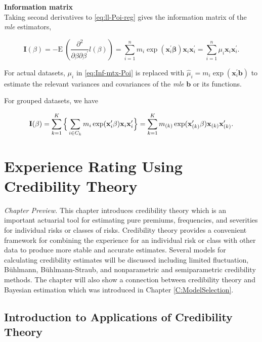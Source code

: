 \documentclass[]{book}
\theoremstyle{definition}
\theoremstyle{definition}
\theoremstyle{definition}
\theoremstyle{remark}
\begin{document}
\textbf{Information matrix}\\
Taking second derivatives to \eqref{eq:ll-Poi-reg} gives the information
matrix of the \emph{mle} estimators,

\begin{equation}
\mathbf{ I}(\beta)=-\mathrm{E~}{\left( \frac{\partial^2}{\partial \beta\partial \beta^{\prime}}l(\beta) \right)}=\sum^n_{i=1}m_i \exp(\mathbf{ x}^{\prime}_i \mathbf{ \beta})\mathbf{ x}_i \mathbf{ x}_i^{\prime}=\sum^n_{i=1} {\mu}_i \mathbf{ x}_i \mathbf{ x}_i^{\prime}.
\label{eq:Inf-mtx-Poi}
\end{equation}

For actual datasets, \({\mu}_i\) in \eqref{eq:Inf-mtx-Poi} is replaced
with \(\hat{\mu}_i=m_i \exp(\mathbf{ x}^{\prime}_i \mathbf{ b})\) to
estimate the relevant variances and covariances of the \emph{mle}
\(\mathbf{ b}\) or its functions.

For grouped datasets, we have

\begin{equation}
\mathbf{ I}(\beta)=\sum^K_{k=1} \Big{\{}\sum_{i \in C_k}m_i \exp(\mathbf{ x}^{\prime}_i \mathbf{ \beta})\mathbf{ x}_i \mathbf{ x}_i^{\prime} \Big{\}}=\sum^K_{k=1} m_{(k)} \exp(\mathbf{ x}^{\prime}_{(k)} \mathbf{ \beta})\mathbf{ x}_{(k)} \mathbf{ x}_{(k)}^{\prime}.
\end{equation}

\chapter{Experience Rating Using Credibility
Theory}\label{C:Credibility}

\emph{Chapter Preview.} This chapter introduces credibility theory which
is an important actuarial tool for estimating pure premiums,
frequencies, and severities for individual risks or classes of risks.
Credibility theory provides a convenient framework for combining the
experience for an individual risk or class with other data to produce
more stable and accurate estimates. Several models for calculating
credibility estimates will be discussed including limited fluctuation,
Bühlmann, Bühlmann-Straub, and nonparametric and semiparametric
credibility methods. The chapter will also show a connection between
credibility theory and Bayesian estimation which was introduced in
Chapter \ref{C:ModelSelection}.

\section{Introduction to Applications of Credibility
Theory}\label{introduction-to-applications-of-credibility-theory}
\end{document}
